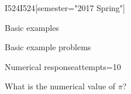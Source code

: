 \documentclass[12pt]{article}
\begin{document}
\begin{edXcourse}{I524}{I524}[semester="2017 Spring"]

\begin{edXchapter}{Basic examples}

\begin{edXsection}{Basic example problems}

\begin{edXvertical}

\begin{edXproblem}{Numerical response}{attempts=10}

What is the numerical value of $\pi$?


\end{edXproblem}
\end{edXvertical}
\end{edXsection}
\end{edXchapter}
\end{edXcourse}
\end{document}
